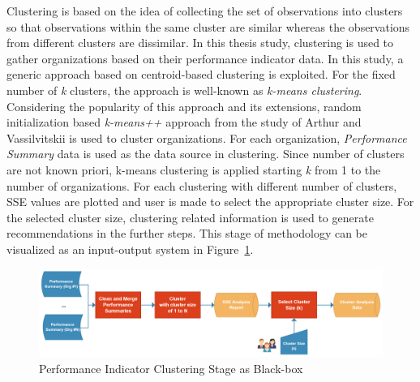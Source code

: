 Clustering is based on the idea of collecting the set of observations into clusters so that observations within the same cluster are similar whereas the observations from different clusters are dissimilar. In this thesis study, clustering is used to gather organizations based on their performance indicator data. In this study, a generic approach based on centroid-based clustering is exploited. For the fixed number of \textit{k} clusters, the approach is well-known as \textit{k-means clustering}. Considering the popularity of this approach and its extensions, random initialization based \textit{k-means++} approach from the study of Arthur and Vassilvitskii \cite{arthur2007} is used to cluster organizations. For each organization, \textit{Performance Summary} data is used as the data source in clustering. Since number of clusters are not known priori, k-means clustering is applied starting \textit{k} from 1 to the number of organizations. For each clustering with different number of clusters, SSE values are plotted and user is made to select the appropriate cluster size. For the selected cluster size, clustering related information is used to generate recommendations in the further steps. This stage of methodology can be visualized as an input-output system in Figure~\ref{fig:performance-indicator-clustering-blackbox}. 
\begin{figure}
  \centering
  \includegraphics[width=\textwidth]{4_methodology/performance-indicator-clustering-blackbox}
  \caption{Performance Indicator Clustering Stage as Black-box }
  \label{fig:performance-indicator-clustering-blackbox}
\end{figure}